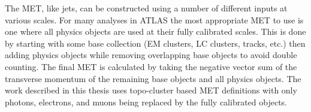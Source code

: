 The MET, like jets, can be constructed using a number of different inputs at various scales.  
For many analyses in ATLAS the most appropriate MET to use is one where all physics objects are used at their fully calibrated scales.  
This is done by starting with some base collection (EM clusters, LC clusters, tracks, etc.) then adding physics objects while removing overlapping base objects to avoid double counting.  
The final MET is calculated by taking the negative vector sum of the transverse momentum of the remaining base objects and all physics objects.  
The work described in this thesis uses topo-cluster based MET definitions with only photons, electrons, and muons being replaced by the fully calibrated objects.  




